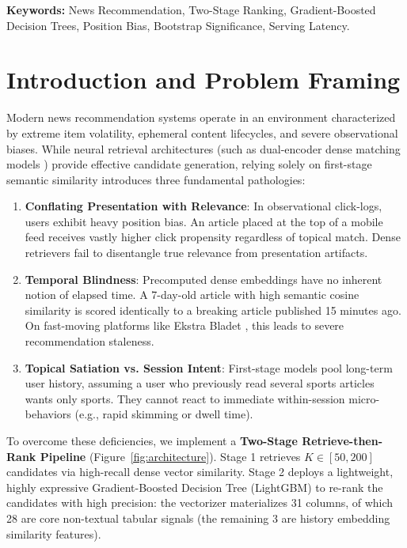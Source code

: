 \documentclass[11pt,a4paper]{article}
\begin{document}
\vspace{0.5em}
\noindent\textbf{Keywords:} News Recommendation, Two-Stage Ranking, Gradient-Boosted Decision Trees, Position Bias, Bootstrap Significance, Serving Latency.

\vspace{1em}
\section{Introduction and Problem Framing}

Modern news recommendation systems operate in an environment characterized by extreme item volatility, ephemeral content lifecycles, and severe observational biases. While neural retrieval architectures (such as dual-encoder dense matching models \cite{wu2019nrms, wu2020mind}) provide effective candidate generation, relying solely on first-stage semantic similarity introduces three fundamental pathologies:
\begin{enumerate}[leftmargin=1.8em, itemsep=2pt]
    \item \textbf{Conflating Presentation with Relevance}: In observational click-logs, users exhibit heavy position bias. An article placed at the top of a mobile feed receives vastly higher click propensity regardless of topical match. Dense retrievers fail to disentangle true relevance from presentation artifacts.
    \item \textbf{Temporal Blindness}: Precomputed dense embeddings have no inherent notion of elapsed time. A 7-day-old article with high semantic cosine similarity is scored identically to a breaking article published 15 minutes ago. On fast-moving platforms like Ekstra Bladet \cite{kruse2024ebnerd}, this leads to severe recommendation staleness.
    \item \textbf{Topical Satiation vs. Session Intent}: First-stage models pool long-term user history, assuming a user who previously read several sports articles wants only sports. They cannot react to immediate within-session micro-behaviors (e.g., rapid skimming or dwell time).
\end{enumerate}

To overcome these deficiencies, we implement a \textbf{Two-Stage Retrieve-then-Rank Pipeline} (Figure~\ref{fig:architecture}). Stage 1 retrieves $K \in [50, 200]$ candidates via high-recall dense vector similarity. Stage 2 deploys a lightweight, highly expressive Gradient-Boosted Decision Tree (LightGBM) to re-rank the candidates with high precision: the vectorizer materializes 31 columns, of which 28 are core non-textual tabular signals (the remaining 3 are history embedding similarity features).
\end{document}
